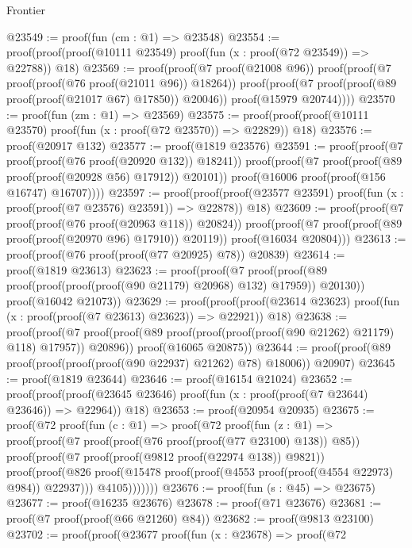 \begin{lexlean}{Frontier}
\begin{coremodule}
@23549 := proof(fun (cm : @1) => @23548)
@23554 := proof(proof(proof(@10111 @23549) proof(fun (x : proof(@72 @23549)) => @22788)) @18)
@23569 := proof(proof(@7 proof(@21008 @96))
      proof(proof(@7 proof(proof(@76 proof(@21011 @96)) @18264))
          proof(proof(@7 proof(proof(@89 proof(proof(@21017 @67) @17850)) @20046))
              proof(@15979 @20744))))
@23570 := proof(fun (zm : @1) => @23569)
@23575 := proof(proof(proof(@10111 @23570) proof(fun (x : proof(@72 @23570)) => @22829)) @18)
@23576 := proof(@20917 @132)
@23577 := proof(@1819 @23576)
@23591 := proof(proof(@7 proof(proof(@76 proof(@20920 @132)) @18241))
      proof(proof(@7 proof(proof(@89 proof(proof(@20928 @56) @17912)) @20101))
          proof(@16006 proof(proof(@156 @16747) @16707))))
@23597 := proof(proof(proof(@23577 @23591)
        proof(fun (x : proof(proof(@7 @23576) @23591)) => @22878))
      @18)
@23609 := proof(proof(@7 proof(proof(@76 proof(@20963 @118)) @20824))
      proof(proof(@7 proof(proof(@89 proof(proof(@20970 @96) @17910)) @20119))
          proof(@16034 @20804)))
@23613 := proof(proof(@76 proof(proof(@77 @20925) @78)) @20839)
@23614 := proof(@1819 @23613)
@23623 := proof(proof(@7
        proof(proof(@89 proof(proof(proof(proof(@90 @21179) @20968) @132) @17959)) @20130))
      proof(@16042 @21073))
@23629 := proof(proof(proof(@23614 @23623)
        proof(fun (x : proof(proof(@7 @23613) @23623)) => @22921))
      @18)
@23638 := proof(proof(@7
        proof(proof(@89 proof(proof(proof(proof(@90 @21262) @21179) @118) @17957)) @20896))
      proof(@16065 @20875))
@23644 := proof(proof(@89 proof(proof(proof(proof(@90 @22937) @21262) @78) @18006)) @20907)
@23645 := proof(@1819 @23644)
@23646 := proof(@16154 @21024)
@23652 := proof(proof(proof(@23645 @23646)
        proof(fun (x : proof(proof(@7 @23644) @23646)) => @22964))
      @18)
@23653 := proof(@20954 @20935)
@23675 := proof(@72
      proof(fun (c : @1) =>
        proof(@72
            proof(fun (z : @1) =>
              proof(proof(@7 proof(proof(@76 proof(proof(@77 @23100) @138)) @85))
                  proof(proof(@7 proof(proof(@9812 proof(@22974 @138)) @9821))
                      proof(proof(@826
                            proof(@15478
                                proof(proof(@4553 proof(proof(@4554 @22973) @984)) @22937)))
                          @4105)))))))
@23676 := proof(fun (s : @45) => @23675)
@23677 := proof(@16235 @23676)
@23678 := proof(@71 @23676)
@23681 := proof(@7 proof(proof(@66 @21260) @84))
@23682 := proof(@9813 @23100)
@23702 := proof(proof(@23677
        proof(fun (x : @23678) =>
          proof(@72

\end{coremodule}
\end{lexlean}
